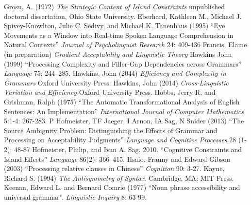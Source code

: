 \documentclass[a4paper]{article}
\begin{document}
 Grosu, A. (1972) {\it The Strategic Content of Island Constraints}
 unpublished doctoral dissertation, Ohio State University.
\newline
\newline
Eberhard, Kathleen M., Michael J. Spivey-Knowlton, Julie C. Sedivy, and Michael K. Tanenhaus (1995) ``Eye Movements as a Window into Real-time Spoken Language Comprehension in Natural Contexts'' {\it Journal of Psycholinguist Research} 24: 409-436
\newline
\newline
Francis, Elaine (in preparation) {\it Gradient Acceptability and Linguistic Theory}
\newline
\newline
Hawkins John (1999) ``Processing Complexity and Filler-Gap Dependencies across Grammars'' {\it Language} 75:  244–285.
\newline
\newline
Hawkins, John (2044) {\it Efficiency and Complexity in Grammars}  Oxford University Press.
\newline
\newline
Hawkins, John (2014) {\it Cross-Linguistic Variation and Efficiency}  Oxford University Press.
\newline
\newline
Hobbs, Jerry R. and Grishman, Ralph (1975) ``The Automatic Transformational Analysis of English Sentences: An Implementation''  {\it International Journal of Computer Mathematics}
5:1-4: 267-283.
\newline
\newline
P Hofmeister, TF Jaeger, I Arnon, IA Sag, N Snider (2013) ``The Source Ambiguity Problem: Distinguishing the Effects of Grammar and Processing on Acceptability Judgments''
{\it Language and Cognitive Processes} 28 (1-2): 48-87
\newline
\newline
Hofmeister, Philip, and Ivan A. Sag. 2010. ``Cognitive Constraints and Island Effects''
{\it Language}
86(2): 366–415.
\newline
\newline
Hsaio, Franny and Edward Gibson (2003) ``Processing relative clauses in Chinese'' {\it Cognition} 90: 3-27.
\newline
\newline
Kayne, Richard S. (1994) {\it The Antisymmetry of Syntax}.  Cambridge, MA:  MIT Press.
\newline
\newline
Keenan, Edward L. and Bernard Comrie (1977) ``Noun phrase accessibility and universal grammar''. {\it Linguistic Inquiry} 8: 63-99.
\end{document}
